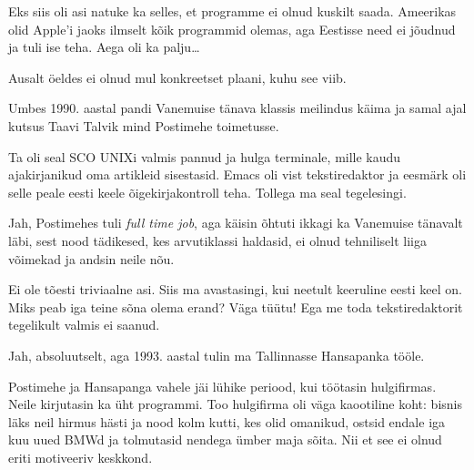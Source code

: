 Eks siis oli asi natuke ka selles, et programme ei olnud
kuskilt saada. Ameerikas olid Apple'i jaoks ilmselt kõik programmid olemas, aga Eestisse need ei jõudnud ja tuli ise teha. Aega oli ka palju\ldots


Ausalt öeldes ei olnud mul konkreetset plaani, kuhu see 
viib.

Umbes 1990. aastal pandi Vanemuise tänava klassis meilindus käima ja 
samal ajal kutsus Taavi Talvik 
mind Postimehe toimetusse.

Ta oli seal SCO UNIXi valmis pannud ja 
hulga terminale, mille kaudu ajakirjanikud oma artikleid 
sisestasid. Emacs oli vist tekstiredaktor ja eesmärk oli selle peale eesti keele 
õigekirjakontroll teha. Tollega ma seal tegelesingi. 


Jah, Postimehes tuli \emph{full time job}, aga käisin õhtuti ikkagi ka Vanemuise tänavalt läbi, sest nood 
tädikesed, kes arvutiklassi haldasid, ei olnud tehniliselt liiga võimekad ja andsin neile nõu. 


Ei ole tõesti triviaalne asi. Siis ma avastasingi, kui neetult keeruline eesti 
keel on. Miks peab iga teine sõna olema erand? Väga tüütu! Ega 
me toda tekstiredaktorit tegelikult valmis ei saanud.


Jah, absoluutselt, aga 1993. aastal tulin ma Tallinnasse 
Hansapanka tööle.


Postimehe ja Hansapanga vahele jäi lühike periood, 
kui töötasin hulgifirmas. Neile kirjutasin ka üht programmi. 
Too hulgifirma oli väga kaootiline koht: bisnis läks 
neil hirmus hästi ja nood kolm kutti, kes olid omanikud, 
ostsid endale iga kuu uued BMWd ja tolmutasid nendega ümber maja sõita. Nii et see 
ei olnud eriti motiveeriv keskkond.

